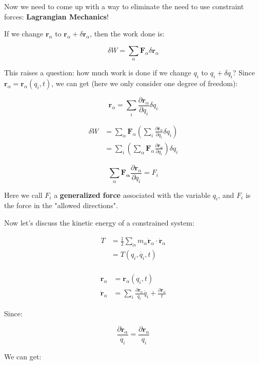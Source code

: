 Now we need to come up with a way to eliminate the need to use constraint forces: \textbf{Lagrangian Mechanics}!

If we change $\mathbf{r}_\alpha$ to $\mathbf{r}_\alpha+\delta \mathbf{r}_\alpha$, then the work done is:

\[
   \delta W = \sum_{\alpha} \mathbf{F}_\alpha \delta \mathbf{r}_\alpha
\]

This raises a question: how much work is done if we change $q_i$ to $q_i+\delta q_i$? Since $\mathbf{r}_\alpha = \mathbf{r}_\alpha(q_i, t)$, we can get (here we only consider one degree of freedom):

\[
   \mathbf{r}_\alpha = \sum_{i} \frac{\partial \mathbf{r}_\alpha}{\partial q_i} \delta q_i
\]

\begin{align*}
    \delta W &= \sum_{\alpha} \mathbf{F}_\alpha \left(\sum_{i} \frac{\partial \mathbf{r}_\alpha}{\partial q_i} \delta q_i \right) \\
             &= \sum_{i} \left(\sum_{\alpha} \mathbf{F}_{\alpha} \frac{ \partial \mathbf{r}_\alpha}{\partial q_i} \right) \delta q_i
\end{align*}

\[
   \sum_{\alpha} \mathbf{F_{\alpha}} \frac{\partial \mathbf{r}_\alpha}{\partial q_i} = F_i
\]

Here we call $F_i$ a \textbf{generalized force} associated with the variable $q_i$, and $F_i$ is the force in the "allowed directions". 

Now let's discuss the kinetic energy of a constrained system:

\begin{align*}
    T &= \frac{1}{2} \sum_{\alpha} m_\alpha \dot{\mathbf{r}}_\alpha \cdot \dot{\mathbf{r}}_\alpha \\
      &= T(q_i, \dot{q_i}, t) \\
\end{align*}

\begin{align*}
    \mathbf{r}_\alpha &= \mathbf{r}_\alpha(q_i, t) \\
    \dot{\mathbf{r}}_\alpha &= \sum_i \frac{\partial \mathbf{r}_\alpha}{q_i} \dot{q_i} + \frac{\partial \mathbf{r}_\alpha}{t}
\end{align*}

Since:

\[
    \frac{\partial \dot{\mathbf{r}}_\alpha}{\dot{q_i}} = \frac{\partial \mathbf{r}_\alpha}{q_i}
\]

We can get:

